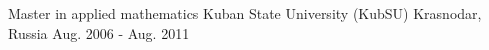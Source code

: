 

\begin{cventries}

  \cventry
    {Master in applied mathematics} %
    {Kuban State University (KubSU)} %
    {Krasnodar, Russia} %
    {Aug. 2006 - Aug. 2011} %
    {}

\end{cventries}
